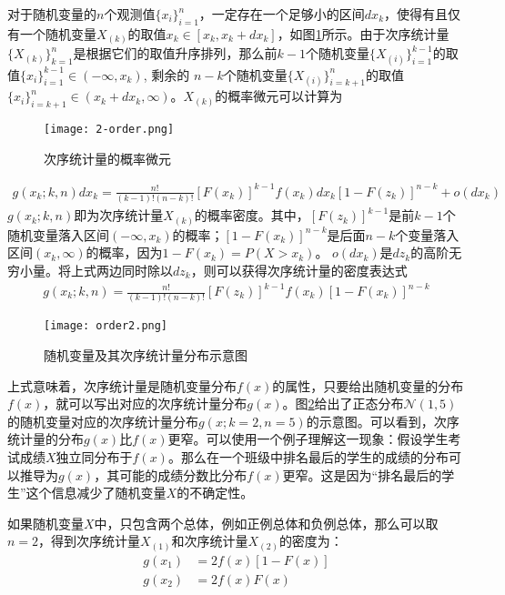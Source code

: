 对于随机变量的$n$个观测值$\{x_i\}_{i=1}^n$，一定存在一个足够小的区间$dx_k$，使得有且仅有一个随机变量$X_{(k)}$的取值$x_k \in [x_k, x_k+dx_k]$，如图\ref{Fig:order}所示。由于次序统计量$\{X_{(k)}\}_{k=1}^n$是根据它们的取值升序排列，那么前$k-1$个随机变量$\{X_{(i)}\}_{i=1}^{k-1}$的取值$\{x_i\}_{i=1}^{k-1} \in (- \infty ,{x_k})$, 剩余的 $n-k$个随机变量$\{X_{(i)}\}_{i={k+1}}^{n}$的取值$\{x_{i}\}_{i=k+1}^n \in ({x_k} + d{x_k},\infty )$。$X_{(k)}$的概率微元可以计算为
\begin{figure}[!t]
	\centering
	\texttt{[image: 2-order.png]}
	\caption{次序统计量的概率微元}
	\label{Fig:order}
\end{figure}
\begin{equation}\label{Eq:ProbDiff}
	\begin{aligned}
		g({x_k}; k,n)d{x_k} = \frac{{n!}}{{(k - 1)!(n - k)!}}{[F({x_k})]^{k - 1}} f({x_k})d{x_k}{[1 - F({z_k})]^{n - k}} + o(d{x_k}) \nonumber
	\end{aligned}
\end{equation}
$g({x_k}; k,n)$即为次序统计量$X_{(k)}$的概率密度。其中，${[F({z_k})]^{k - 1}}$是前$k-1$个随机变量落入区间$(- \infty ,{x_k})$的概率；${[1 - F({x_k})]^{n - k}}$是后面$n-k$个变量落入区间$({x_k},\infty )$的概率，因为$1 - F({x_k}) = P(X > {x_k})$。 $o(d{x_k})$是$d{z_k}$的高阶无穷小量。将上式两边同时除以$d{z_k}$，则可以获得次序统计量的密度表达式
\begin{equation}
	\begin{aligned}
g({x_k};k,n) =   \frac{{n!}}{{(k - 1)!(n - k)!}} {[F({z_k})]^{k - 1}}f({x_k}){[1 - F({x_k})]^{n - k}} \nonumber
	\end{aligned}
\end{equation}
\begin{figure}[!htbp]
	\centering
	\texttt{[image: order2.png]}
	\caption{随机变量及其次序统计量分布示意图}
	\label{Fig:order2}
\end{figure}
上式意味着，次序统计量是随机变量分布$f(x)$的属性，只要给出随机变量的分布$f(x)$，就可以写出对应的次序统计量分布$g(x)$。图\ref{Fig:order2}给出了正态分布$\mathcal{N}(1,5)$的随机变量对应的次序统计量分布$g({x};k=2,n=5)$的示意图。可以看到，次序统计量的分布$g(x)$比$f(x)$更窄。可以使用一个例子理解这一现象：假设学生考试成绩$X$独立同分布于$f(x)$。那么在一个班级中排名最后的学生的成绩的分布可以推导为$g(x)$，其可能的成绩分数比分布$f(x)$更窄。这是因为“排名最后的学生”这个信息减少了随机变量$X$的不确定性。

如果随机变量$X$中，只包含两个总体，例如正例总体和负例总体，那么可以取$n=2$，得到次序统计量$X_{(1)}$和次序统计量$X_{(2)}$的密度为：
\begin{align}
g(x_1) &= 2 f(x) [1-F(x)] \\
g(x_2)&= 2 f(x)F(x)
\end{align}

